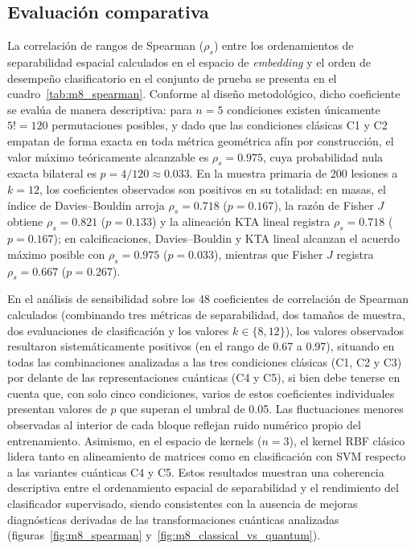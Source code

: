 
\subsection{Evaluación comparativa}
\label{sec:comparacion_global}



La correlación de rangos de Spearman ($\rho_s$) entre los ordenamientos de separabilidad espacial calculados en el espacio de \textit{embedding} y el orden de desempeño clasificatorio en el conjunto de prueba se presenta en el cuadro~\ref{tab:m8_spearman}. Conforme al diseño metodológico, dicho coeficiente se evalúa de manera descriptiva: para $n = 5$ condiciones existen únicamente $5! = 120$ permutaciones posibles, y dado que las condiciones clásicas C1 y C2 empatan de forma exacta en toda métrica geométrica afín por construcción, el valor máximo teóricamente alcanzable es $\rho_s = 0.975$, cuya probabilidad nula exacta bilateral es $p = 4/120 \approx 0.033$. En la muestra primaria de 200 lesiones a $k = 12$, los coeficientes observados son positivos en su totalidad: en masas, el índice de Davies--Bouldin arroja $\rho_s = 0.718$ ($p = 0.167$), la razón de Fisher $J$ obtiene $\rho_s = 0.821$ ($p = 0.133$) y la alineación KTA lineal registra $\rho_s = 0.718$ ($p = 0.167$); en calcificaciones, Davies--Bouldin y KTA lineal alcanzan el acuerdo máximo posible con $\rho_s = 0.975$ ($p = 0.033$), mientras que Fisher $J$ registra $\rho_s = 0.667$ ($p = 0.267$).

En el análisis de sensibilidad sobre los 48 coeficientes de correlación de Spearman calculados (combinando tres métricas de separabilidad, dos tamaños de muestra, dos evaluaciones de clasificación y los valores $k \in \{8, 12\}$), los valores observados resultaron sistemáticamente positivos (en el rango de 0.67 a 0.97), situando en todas las combinaciones analizadas a las tres condiciones clásicas (C1, C2 y C3) por delante de las representaciones cuánticas (C4 y C5), si bien debe tenerse en cuenta que, con solo cinco condiciones, varios de estos coeficientes individuales presentan valores de $p$ que superan el umbral de 0.05. Las fluctuaciones menores observadas al interior de cada bloque reflejan ruido numérico propio del entrenamiento. Asimismo, en el espacio de kernels ($n = 3$), el kernel RBF clásico lidera tanto en alineamiento de matrices como en clasificación con SVM respecto a las variantes cuánticas C4 y C5. Estos resultados muestran una coherencia descriptiva entre el ordenamiento espacial de separabilidad y el rendimiento del clasificador supervisado, siendo consistentes con la ausencia de mejoras diagnósticas derivadas de las transformaciones cuánticas analizadas (figuras~\ref{fig:m8_spearman} y~\ref{fig:m8_classical_vs_quantum}).

